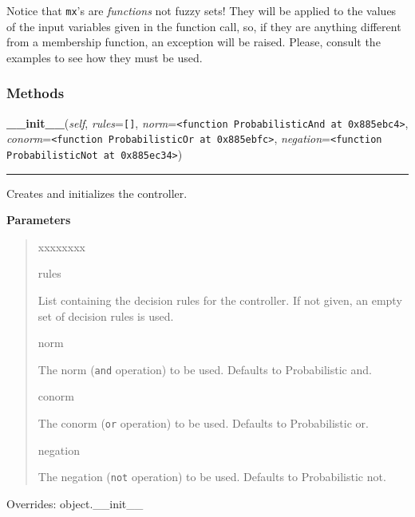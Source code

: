 Notice that \texttt{mx}'s are \emph{functions} not fuzzy sets! They will be applied to
the values of the input variables given in the function call, so, if they
are anything different from a membership function, an exception will be
raised. Please, consult the examples to see how they must be used.


  \subsubsection{Methods}

    \vspace{0.5ex}

    \begin{boxedminipage}{\textwidth}

    \raggedright \textbf{\_\_init\_\_}(\textit{self}, \textit{rules}=\texttt{\texttt{[}\texttt{]}}, \textit{norm}=\texttt{{\textless}function ProbabilisticAnd at 0x885ebc4{\textgreater}}, \textit{conorm}=\texttt{{\textless}function ProbabilisticOr at 0x885ebfc{\textgreater}}, \textit{negation}=\texttt{{\textless}function ProbabilisticNot at 0x885ec34{\textgreater}})

    \vspace{-1.5ex}

    \rule{\textwidth}{0.5\fboxrule}

Creates and initializes the controller.
    \vspace{1ex}

      \textbf{Parameters}
      \begin{quote}
        \begin{Ventry}{xxxxxxxx}

          \item[rules]


List containing the decision rules for the controller. If not given,
an empty set of decision rules is used.
          \item[norm]


The norm (\texttt{and} operation) to be used. Defaults to Probabilistic
and.
          \item[conorm]


The conorm (\texttt{or} operation) to be used. Defaults to Probabilistic
or.
          \item[negation]


The negation (\texttt{not} operation) to be used. Defaults to
Probabilistic not.
        \end{Ventry}

      \end{quote}

    \vspace{1ex}

      Overrides: object.\_\_init\_\_

    \end{boxedminipage}

